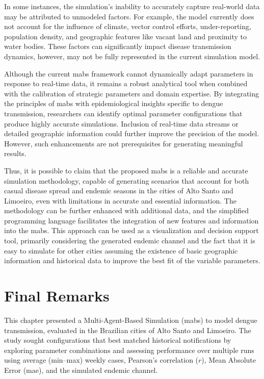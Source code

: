 In some instances, the simulation's inability to accurately capture real-world data may be attributed to unmodeled factors. For example, the model currently does not account for the influence of climate, vector control efforts, under-reporting, population density, and geographic features like vacant land and proximity to water bodies. These factors can significantly impact disease transmission dynamics, however, may not be fully represented in the current simulation model.

Although the current \gls{mabs} framework cannot dynamically adapt parameters in response to real-time data, it remains a robust analytical tool when combined with the calibration of strategic parameters and domain expertise. By integrating the principles of \gls{mabs} with epidemiological insights specific to dengue transmission, researchers can identify optimal parameter configurations that produce highly accurate simulations. Inclusion of real-time data streams or detailed geographic information could further improve the precision of the model. However, such enhancements are not prerequisites for generating meaningful results.

Thus, it is possible to claim that the proposed \gls{mabs} is a reliable and accurate simulation methodology, capable of generating scenarios that account for both casual disease spread and endemic seasons in the cities of Alto Santo and Limoeiro, even with limitations in accurate and essential information. The methodology can be further enhanced with additional data, and the simplified programming language facilitates the integration of new features and information into the \gls{mabs}. This approach can be used as a visualization and decision support tool, primarily considering the generated endemic channel and the fact that it is easy to simulate for other cities assuming the existence of basic geographic information and historical data to improve the best fit of the variable parameters.

\section{Final Remarks}\label{sec:final-remarks}

This chapter presented a Multi-Agent-Based Simulation (\gls{mabs}) to model dengue transmission, evaluated in the Brazilian cities of Alto Santo and Limoeiro. The study sought configurations that best matched historical notifications by exploring parameter combinations and assessing performance over multiple runs using average (min–max) weekly cases, Pearson’s correlation ($r$), Mean Absolute Error (\gls{mae}), and the simulated endemic channel.

